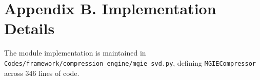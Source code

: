 \section*{Appendix B. Implementation Details}
The module implementation is maintained in \texttt{Codes/framework/compression\_engine/mgie\_svd.py}, defining \texttt{MGIECompressor} across 346 lines of code.
